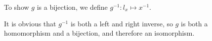 To show $g$ is a bijection, we define $g^{-1}: l_x \mapsto x^{-1}$.

It is obvious that $g^{-1}$ is both a left and right inverse, so $g$ is both a homomorphism and a bijection, and therefore an isomorphism.

% 
% 
% 
% 
% 
% 
% 
% 
% 
% 
% 
% 